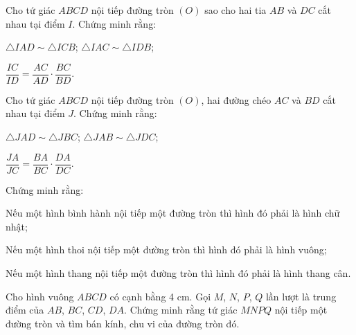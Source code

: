 \begin{practice}
\begin{questions}[resume=SBT]
        \answerline
        \answerline
        \answerline

        \item Cho tứ giác $ABCD$ nội tiếp đường tròn $(O)$ sao cho hai tia $AB$ và $DC$ cắt nhau tại điểm $I$. Chứng minh rằng:
        \begin{questions}
            \item $\triangle IAD\sim\triangle ICB$; $\triangle IAC\sim\triangle IDB$;
            \item $\dfrac{IC}{ID}=\dfrac{AC}{AD}\cdot\dfrac{BC}{BD}$.
        \end{questions}

        \answerline
        \answerline
        \answerline

        \item Cho tứ giác $ABCD$ nội tiếp đường tròn $(O)$, hai đường chéo $AC$ và $BD$ cắt nhau tại điểm $J$. Chứng minh rằng:
        \begin{questions}
            \item $\triangle JAD\sim\triangle JBC$; $\triangle JAB\sim\triangle JDC$;
            \item $\dfrac{JA}{JC}=\dfrac{BA}{BC}\cdot\dfrac{DA}{DC}$.
        \end{questions}

        \answerline
        \answerline
        \answerline

        \item Chứng minh rằng:
        \begin{questions}
            \item Nếu một hình bình hành nội tiếp một đường tròn thì hình đó phải là hình chữ nhật;
            \item Nếu một hình thoi nội tiếp một đường tròn thì hình đó phải là hình vuông;
            \item Nếu một hình thang nội tiếp một đường tròn thì hình đó phải là hình thang cân.
        \end{questions}

        \answerline
        \answerline
        \answerline

        \item Cho hình vuông $ABCD$ có cạnh bằng 4 cm. Gọi $M$, $N$, $P$, $Q$ lần lượt là trung điểm của $AB$, $BC$, $CD$, $DA$. Chứng minh rằng tứ giác $MNPQ$ nội tiếp một đường tròn và tìm bán kính, chu vi của đường tròn đó.

        \answerline
        \answerline
        \answerline


\end{questions}
\end{practice}
